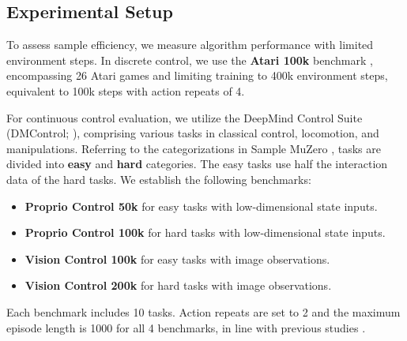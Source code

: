 \subsection{Experimental Setup}

To assess sample efficiency, we measure algorithm performance with limited environment steps. In discrete control, we use the \textbf{Atari 100k} benchmark \citep{1606.01540}, encompassing 26 Atari games and limiting training to 400k environment steps, equivalent to 100k steps with action repeats of 4. 

For continuous control evaluation, we utilize the DeepMind Control Suite (DMControl; \citep{tassa2018deepmind}), comprising various tasks in classical control, locomotion, and manipulations. Referring to the categorizations in Sample MuZero \citep{hubert2021learning}, tasks are divided into \textbf{easy} and \textbf{hard} categories. The easy tasks use half the interaction data of the hard tasks. We establish the following benchmarks:
\begin{itemize}
    \item \textbf{Proprio Control 50k} for easy tasks with low-dimensional state inputs.
    \item \textbf{Proprio Control 100k} for hard tasks with low-dimensional state inputs.
    \item \textbf{Vision Control 100k} for easy tasks with image observations.
    \item \textbf{Vision Control 200k} for hard tasks with image observations.
\end{itemize}
Each benchmark includes 10 tasks. Action repeats are set to 2 and the maximum episode length is 1000 for all 4 benchmarks, in line with previous studies \citep{hafner2023mastering, Anonymous2023TDMPC2}.






% 


